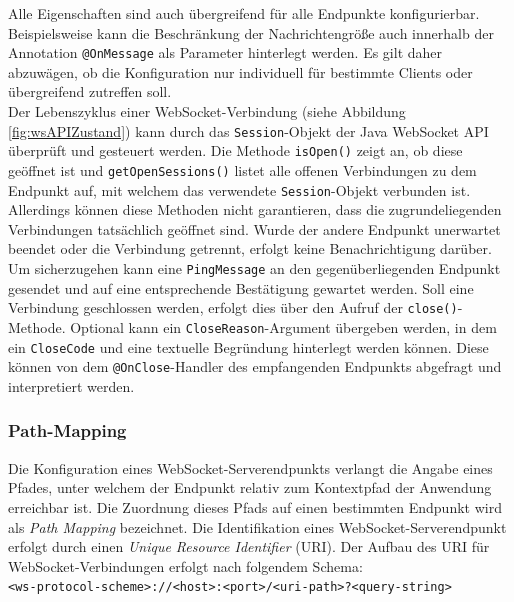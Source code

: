 \documentclass[11pt,a4paper,titlepage]{scrartcl}
\numberwithin{equation}{section}
\begin{document}
\noindent Alle Eigenschaften sind auch übergreifend für alle Endpunkte konfigurierbar. Beispielsweise kann die Beschränkung der Nachrichtengröße auch innerhalb der Annotation \texttt{@OnMessage} als Parameter hinterlegt werden. Es gilt daher abzuwägen, ob die Konfiguration nur individuell für bestimmte Clients oder übergreifend zutreffen soll. \\

\noindent Der Lebenszyklus einer WebSocket-Verbindung (siehe Abbildung \ref{fig:wsAPIZustand}) kann durch das \texttt{Session}-Objekt der Java WebSocket API überprüft und gesteuert werden. Die Methode \texttt{isOpen()} zeigt an, ob diese geöffnet ist und \texttt{getOpenSessions()} listet alle offenen Verbindungen zu dem Endpunkt auf, mit welchem das verwendete \texttt{Session}-Objekt verbunden ist. Allerdings können diese Methoden nicht garantieren, dass die zugrundeliegenden Verbindungen tatsächlich geöffnet sind. Wurde der andere Endpunkt unerwartet beendet oder die Verbindung getrennt, erfolgt keine Benachrichtigung darüber. Um sicherzugehen kann eine \texttt{PingMessage} an den gegenüberliegenden Endpunkt gesendet und auf eine entsprechende Bestätigung gewartet werden. Soll eine Verbindung geschlossen werden, erfolgt dies über den Aufruf der \texttt{close()}-Methode. Optional kann ein \texttt{CloseReason}-Argument übergeben werden, in dem ein \texttt{CloseCode} und eine textuelle Begründung hinterlegt werden können. Diese können von dem \texttt{@OnClose}-Handler des empfangenden Endpunkts abgefragt und interpretiert werden. \\

\subsubsection{Path-Mapping}\label{subsubsec:apiPathMapping}
Die Konfiguration eines WebSocket-Serverendpunkts verlangt die Angabe eines Pfades, unter welchem der Endpunkt relativ zum Kontextpfad der Anwendung erreichbar ist. Die Zuordnung dieses Pfads auf einen bestimmten Endpunkt wird als \textit{Path Mapping} bezeichnet. Die Identifikation eines WebSocket-Serverendpunkt erfolgt durch einen \textit{Unique Resource Identifier} (URI). Der Aufbau des URI für WebSocket-Verbindungen erfolgt nach folgendem Schema:\\

\noindent \texttt{<ws-protocol-scheme>://<host>:<port>/<uri-path>?<query-string>}\\
\end{document}
